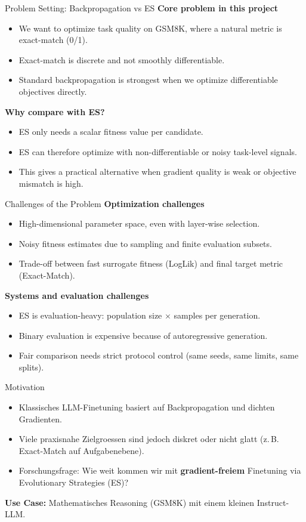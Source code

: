 \documentclass[aspectratio=169,11pt]{beamer}
\begin{document}
\begin{frame}{Problem Setting: Backpropagation vs ES}
\textbf{Core problem in this project}
\begin{itemize}
  \item We want to optimize task quality on GSM8K, where a natural metric is exact-match (0/1).
  \item Exact-match is discrete and not smoothly differentiable.
  \item Standard backpropagation is strongest when we optimize differentiable objectives directly.
\end{itemize}

\textbf{Why compare with ES?}
\begin{itemize}
  \item ES only needs a scalar fitness value per candidate.
  \item ES can therefore optimize with non-differentiable or noisy task-level signals.
  \item This gives a practical alternative when gradient quality is weak or objective mismatch is high.
\end{itemize}
\end{frame}

\begin{frame}{Challenges of the Problem}
\textbf{Optimization challenges}
\begin{itemize}
  \item High-dimensional parameter space, even with layer-wise selection.
  \item Noisy fitness estimates due to sampling and finite evaluation subsets.
  \item Trade-off between fast surrogate fitness (LogLik) and final target metric (Exact-Match).
\end{itemize}

\textbf{Systems and evaluation challenges}
\begin{itemize}
  \item ES is evaluation-heavy: population size $\times$ samples per generation.
  \item Binary evaluation is expensive because of autoregressive generation.
  \item Fair comparison needs strict protocol control (same seeds, same limits, same splits).
\end{itemize}
\end{frame}

\begin{frame}{Motivation}
\begin{itemize}
  \item Klassisches LLM-Finetuning basiert auf Backpropagation und dichten Gradienten.
  \item Viele praxisnahe Zielgroessen sind jedoch diskret oder nicht glatt (z.\,B. Exact-Match auf Aufgabenebene).
  \item Forschungsfrage: Wie weit kommen wir mit \textbf{gradient-freiem} Finetuning via Evolutionary Strategies (ES)?
\end{itemize}
\vspace{0.5em}
\textbf{Use Case:} Mathematisches Reasoning (GSM8K) mit einem kleinen Instruct-LLM.
\end{frame}
\end{document}
